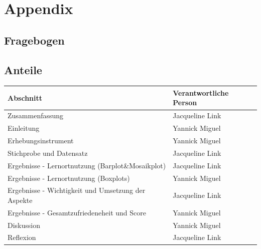 \documentclass[11pt, a4paper]{article}
\begin{document}
\newpage
\section{Appendix}
\subsection{Fragebogen}

\begin{figure}[h]
	
\end{figure}
\pagestyle{plain}
\newpage
\begin{figure}[h]
	
\end{figure}
\newpage
\begin{figure}[h]
	
\end{figure}
\newpage
\begin{figure}[h]
	
\end{figure}
\newpage
\subsection{Anteile}
\begin{table}[h]
	\begin{tabular}{l|l}
		Abschnitt                                          & Verantwortliche Person \\ \hline
		Zusammenfassung                                    & Jacqueline Link        \\
		Einleitung                                         & Yannick Miguel         \\
		Erhebungsinstrument                                & Yannick Miguel         \\
		Stichprobe und Datensatz                           &
		Jacqueline Link        \\
		Ergebnisse - Lernortnutzung (Barplot\&Mosaikplot)                       & Jacqueline Link        \\
		Ergebnisse - Lernortnutzung (Boxplots)                       & Yannick Miguel       \\
		Ergebnisse - Wichtigkeit und Umsetzung der Aspekte & Jacqueline Link        \\
		Ergebnisse - Gesamtzufriedeneheit und Score        & Yannick Miguel         \\
		Diskussion                                         & Yannick Miguel         \\
		Reflexion                                          & Jacqueline Link       
	\end{tabular}
\end{table}
\end{document}
